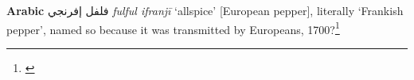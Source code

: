 \begin{etymology}\label{ety:fulful ifranji}
\textbf{Arabic} {فلفل إفرنجي} \textit{fulful ifranjī} `allspice' [European pepper], literally `Frankish pepper', named so because it was transmitted by Europeans, 1700?\footnote{\textcite{baalbaki_-mawrid_1995}}
\end{etymology}